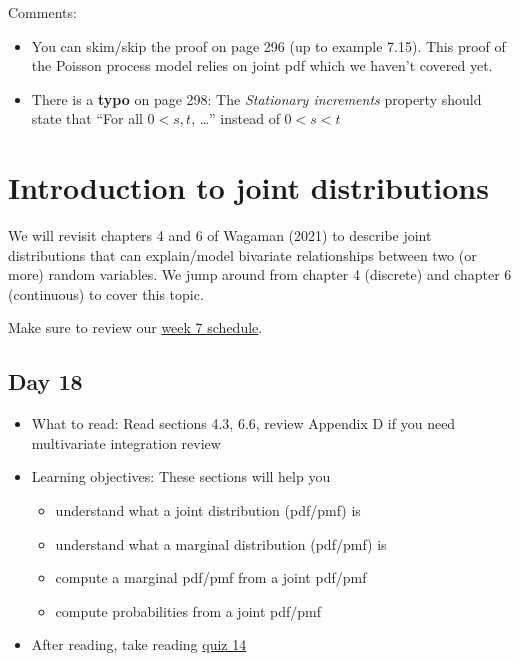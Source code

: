\documentclass[
  letterpaper,
]{scrbook}
\providecommand{\tightlist}{%
  \setlength{\itemsep}{0pt}\setlength{\parskip}{0pt}}\usepackage{longtable,booktabs,array}
\begin{document}
Comments:

\begin{itemize}
\item
  You can skim/skip the proof on page 296 (up to example 7.15). This
  proof of the Poisson process model relies on joint pdf which we
  haven't covered yet.
\item
  There is a \textbf{typo} on page 298: The \emph{Stationary increments}
  property should state that ``For all \(0 < s,t\), \ldots{}'' instead
  of \(0 < s < t\)
\end{itemize}


\chapter{Introduction to joint
distributions}\label{sec-intro-joint-dist}

We will revisit chapters 4 and 6 of Wagaman (2021) to describe joint
distributions that can explain/model bivariate relationships between two
(or more) random variables. We jump around from chapter 4 (discrete) and
chapter 6 (continuous) to cover this topic.

Make sure to review our
\href{https://docs.google.com/spreadsheets/d/10AP55TSo0bgqklDCOioCiiBYEZAyhIytcNe8qmd2nu8/edit?usp=sharing}{week
7 schedule}.

\section*{Day 18}\label{day-18}


\begin{itemize}
\item
  What to read: Read sections 4.3, 6.6, review Appendix D if you need
  multivariate integration review
\item
  Learning objectives: These sections will help you

  \begin{itemize}
  \tightlist
  \item
    understand what a joint distribution (pdf/pmf) is
  \item
    understand what a marginal distribution (pdf/pmf) is
  \item
    compute a marginal pdf/pmf from a joint pdf/pmf
  \item
    compute probabilities from a joint pdf/pmf
  \end{itemize}
\item
  After reading, take reading
  \href{https://forms.gle/XKWqF5TZ1qVWDscE9}{quiz 14}
\end{itemize}
\end{document}
